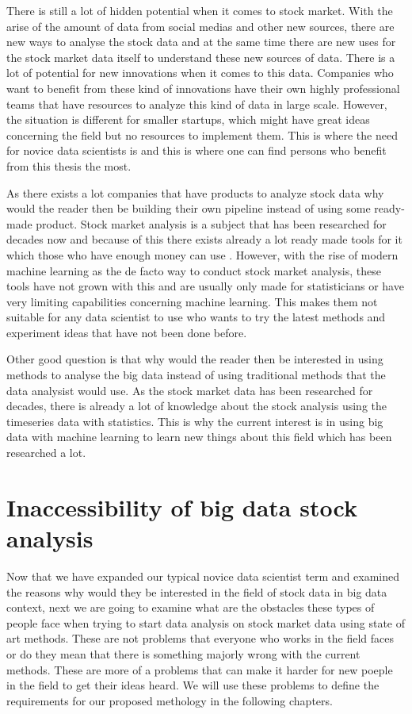 There is still a lot of hidden potential when it comes to stock market.
With the arise of the amount of data from social medias and other new sources, there are new ways to analyse the stock data and at the same time there are new uses for the stock market data itself to understand these new sources of data.
There is a lot of potential for new innovations when it comes to this data.
Companies who want to benefit from these kind of innovations have their own highly professional teams that have resources to analyze this kind of data in large scale.
However, the situation is different for smaller startups, which might have great ideas concerning the field but no resources to implement them.
This is where the need for novice data scientists is and this is where one can find persons who benefit from this thesis the most.

As there exists a lot companies that have products to analyze stock data why would the reader then be building their own pipeline instead of using some ready-made product.
Stock market analysis is a subject that has been researched for decades now and because of this there exists already a lot ready made tools for it which those who have enough money can use \cite{metastock} \cite{worden}.
However, with the rise of modern machine learning as the de facto way to conduct stock market analysis, these tools have not grown with this and are usually only made for statisticians or have very limiting capabilities concerning machine learning.
This makes them not suitable for any data scientist to use who wants to try the latest methods and experiment ideas that have not been done before.

Other good question is that why would the reader then be interested in using methods to analyse the big data instead of using traditional methods that the data analysist would use.
As the stock market data has been researched for decades, there is already a lot of knowledge about the stock analysis using the timeseries data with statistics.
This is why the current interest is in using big data with machine learning to learn new things about this field which has been researched a lot.


\section{Inaccessibility of big data stock analysis}

Now that we have expanded our typical novice data scientist term and examined the reasons why would they be interested in the field of stock data in big data context, next we are going to examine what are the obstacles these types of people face when trying to start data analysis on stock market data using state of art methods.
These are not problems that everyone who works in the field faces or do they mean that there is something majorly wrong with the current methods.
These are more of a problems that can make it harder for new poeple in the field to get their ideas heard.
We will use these problems to define the requirements for our proposed methology in the following chapters.

